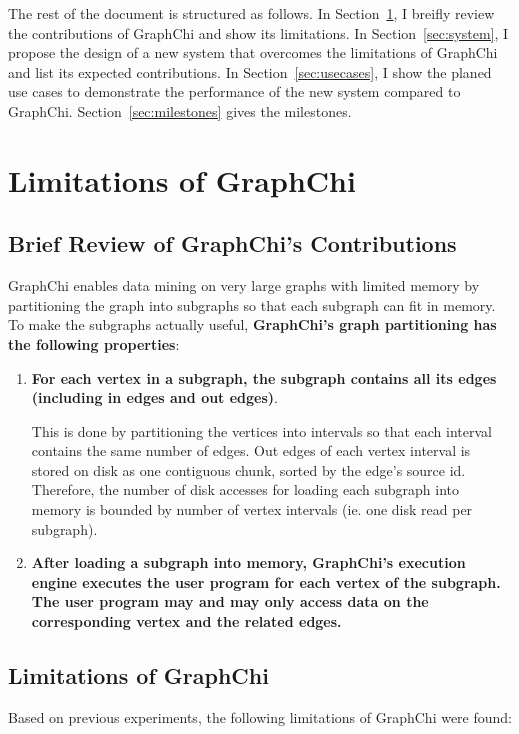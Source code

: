 \documentclass[10pt, twocolumn, a4paper]{article}
\begin{document}
The rest of the document is structured as follows. In Section~\ref{sec:reviewgraphchi}, I breifly review the contributions of GraphChi and show its limitations. In Section~\ref{sec:system}, I propose the design of a new system that overcomes the limitations of GraphChi and list its expected contributions. In Section~\ref{sec:usecases}, I show the planed use cases to demonstrate the performance of the new system compared to GraphChi. Section~\ref{sec:milestones} gives the milestones.

\section{Limitations of GraphChi}
\label{sec:reviewgraphchi}
\subsection{Brief Review of GraphChi's Contributions}
GraphChi enables data mining on very large graphs with limited memory by partitioning the graph into subgraphs so that each subgraph can fit in memory. To make the subgraphs actually useful, \textbf{GraphChi's graph partitioning has the following properties}:
\begin{enumerate}
  \item \textbf{For each vertex in a subgraph, the subgraph contains all its edges (including in edges and out edges)}.
    
    This is done by partitioning the vertices into intervals so that each interval contains the same number of edges. Out edges of each vertex interval is stored on disk as one contiguous chunk, sorted by the edge's source id. Therefore, the number of disk accesses for loading each subgraph into memory is bounded by number of vertex intervals (ie. one disk read per subgraph).
 
  \item \textbf{After loading a subgraph into memory, GraphChi's execution engine executes the user program for each vertex of the subgraph. The user program may and may only access data on the corresponding vertex and the related edges.}
    
\end{enumerate}

\subsection{Limitations of GraphChi}
\label{sec:limitations}
Based on previous experiments, the following limitations of GraphChi were found:
\end{document}
